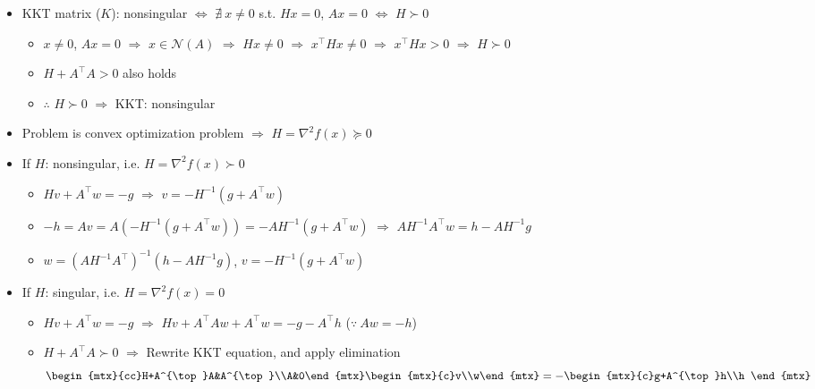 \begin{itemize}
    \item KKT matrix ($K$): nonsingular $\Leftrightarrow$ $\nexists~x\neq 0$ s.t. $Hx=0$, $Ax=0$ $\Leftrightarrow$ $H\succ 0$
    \begin{itemize}
        \item $x\neq 0$, $Ax=0$ $\Rightarrow$ $x\in\mathcal{N}(A)$ $\Rightarrow$ $Hx\neq 0$ $\Rightarrow$ $x^{\top}Hx\neq 0$ $\Rightarrow$ $x^{\top}Hx>0$ $\Rightarrow$ $H\succ 0$
        \item $H+A^{\top}A>0$ also holds
        \item $\therefore$ $H\succ 0$ $\Rightarrow$ KKT: nonsingular
    \end{itemize}
    \item Problem is convex optimization problem $\Rightarrow$ $H=\nabla^2 f(x)\succeq 0$
    \item If $H$: nonsingular, i.e. $H=\nabla^2 f(x)\succ 0$
    \begin{itemize}
        \item $Hv+A^{\top}w=-g$ $\Rightarrow$ $v=-H^{-1}(g+A^{\top}w)$
        \item $-h=Av=A\left(-H^{-1}(g+A^{\top}w)\right)=-AH^{-1}(g+A^{\top}w)$ $\Rightarrow$ $AH^{-1}A^{\top}w=h-AH^{-1}g$
        \item $w=\left(AH^{-1}A^{\top}\right)^{-1}\left(h-AH^{-1}g\right)$, $v=-H^{-1}\left(g+A^{\top}w\right)$
    \end{itemize}
    \item If $H$: singular, i.e. $H=\nabla^2 f(x)=0$
    \begin{itemize}
        \item $Hv+A^{\top}w=-g$ $\Rightarrow$ $Hv+A^{\top}Aw+A^{\top}w=-g-A^{\top}h$ ($\because~Aw=-h$)
        \item $H+A^{\top}A\succ 0$ $\Rightarrow$ Rewrite KKT equation, and apply elimination
        \begin{equation}
            \begin{mtx}{cc}H+A^{\top}A&A^{\top}\\A&0\end{mtx}\begin{mtx}{c}v\\w\end{mtx}=-\begin{mtx}{c}g+A^{\top}h\\h
        \end{mtx}\end{equation}
    \end{itemize}
\end{itemize}

